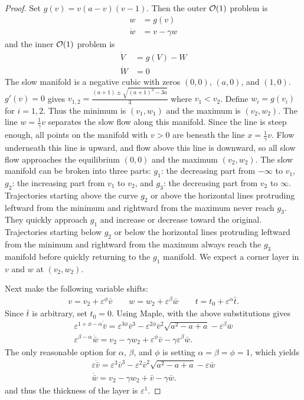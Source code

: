 \documentclass{article} %
\theoremstyle{plain}
\newcommand{\E}{\varepsilon}
\numberwithin{equation}{section} %
\numberwithin{figure}{section} %
\numberwithin{table}{section} %
\begin{document}
\begin{proof}
    Set $g(v) = v(a - v)(v - 1)$.  Then the outer $\order{1}$ problem is
    \begin{align*}
        w &= g(v) \\
        \dot{w} &= v - \gamma w
    \end{align*}
    and the inner $\order{1}$ problem is
    \begin{align*}
        \dot{V} &= g(V) - W \\
        \dot{W} &= 0
    \end{align*}
    The slow manifold is a negative cubic with zeros $(0, 0)$, $(a, 0)$, and $(1, 0)$.  $g'(v) = 0$ gives $v_{1,2} = \frac{(a + 1) \pm \sqrt{(a + 1)^3 - 3a}}{3}$ where $v_1 < v_2$.  Define $w_{i} = g(v_i)$ for $i = 1, 2$.  Thus the minimum is $(v_1, w_1)$ and the maximum is $(v_2, w_2)$.  The line $w = \frac{1}{\gamma}v$ separates the slow flow along this manifold.  Since the line is steep enough, all points on the manifold with $v > 0$ are beneath the line $x = \frac{1}{\gamma}v$.  Flow underneath this line is upward, and flow above this line is downward, so all slow flow approaches the equilibrium $(0, 0)$ and the maximum $(v_2, w_2)$.  The slow manifold can be broken into three parts: $g_1$: the decreasing part from $-\infty$ to $v_1$, $g_2$: the increasing part from $v_1$ to $v_2$, and $g_3$: the decreasing part from $v_2$ to $\infty$.  Trajectories starting above the curve $g_2$ or above the horizontal lines protruding leftward from the minimum and rightward from the maximum never reach $g_3$.  They quickly approach $g_1$ and increase or decrease toward the original.  Trajectories starting below $g_2$ or below the horizontal lines protruding leftward from the minimum and rightward from the maximum always reach the $g_3$ manifold before quickly returning to the $g_1$ manifold.  We expect a corner layer in $v$ and $w$ at $(v_2, w_2)$.

    Next make the following variable shifts:
    \begin{align*}
        v = v_2 + \E^\phi \bar{v} \qquad w = w_2 + \E^\beta \bar{w} \qquad t = t_0 + \E^\alpha \bar{t}.
    \end{align*}
    Since $\bar{t}$ is arbitrary, set $t_0 = 0$.  Using Maple, with the above substitutions gives
    \begin{align*}
        \E^{1 + \phi - \alpha}\dot{\bar{v}} = \E^{3\phi}\bar{v}^3 - \E^{2\phi}\bar{v}^2\sqrt{a^2 - a + a} - \E^\beta \bar{w} \\
        \E^{\beta - \alpha}\dot{\bar{w}} = v_2 - \gamma w_2 + \E^\phi \bar{v} - \gamma \E^\beta \bar{w}.
    \end{align*}
    The only reasonable option for $\alpha$, $\beta$, and $\phi$ is setting $\alpha = \beta = \phi = 1$, which yields
    \begin{align*}
        \E\dot{\bar{v}} = \E^3\bar{v}^3 - \E^2\bar{v}^2\sqrt{a^2 - a + a} - \E\bar{w} \\
        \dot{\bar{w}} = v_2 - \gamma w_2 + \bar{v} - \gamma \bar{w}.
    \end{align*}
    and thus the thickness of the layer is $\E^1$.
\end{proof}
    
\end{document}
